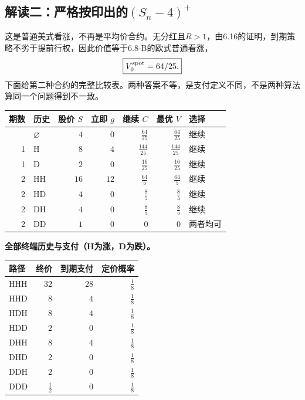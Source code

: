 \documentclass[11pt,a4paper,UTF8,fontset=fandol]{ctexart}
\begin{document}
\endgroup

\subsection{\texorpdfstring{解读二：严格按印出的\((S_n-4)^+\)}{解读二：严格按印出的(S\_n-4)\^{}+}}\label{ux89e3ux8bfbux4e8cux4e25ux683cux6309ux5370ux51faux7684s_n-4}

这是普通美式看涨，不再是平均价合约。无分红且\(R>1\)，由6.16的证明，到期策略不劣于提前行权，因此价值等于6.8-B的欧式普通看涨，
\[\boxed{V_0^{\rm spot}=64/25.}\]
下面给第二种合约的完整比较表。两种答案不等，是支付定义不同，不是两种算法算同一个问题得到不一致。

\begingroup
\small
\setlength{\tabcolsep}{4pt}
\renewcommand{\arraystretch}{1.10}

\begin{longtable}[]{@{}rlrrrrl@{}}
\toprule\noalign{}
期数 & 历史 & 股价 \(S\) & 立即 \(g\) & 继续 \(C\) & 最优 \(V\) &
选择 \\
\midrule\noalign{}
\endhead
\bottomrule\noalign{}
\endlastfoot
0 & \(\varnothing\) & \(4\) & \(0\) & \(\frac{64}{25}\) &
\(\frac{64}{25}\) & 继续 \\
1 & H & \(8\) & \(4\) & \(\frac{144}{25}\) & \(\frac{144}{25}\) &
继续 \\
1 & D & \(2\) & \(0\) & \(\frac{16}{25}\) & \(\frac{16}{25}\) & 继续 \\
2 & HH & \(16\) & \(12\) & \(\frac{64}{5}\) & \(\frac{64}{5}\) & 继续 \\
2 & HD & \(4\) & \(0\) & \(\frac{8}{5}\) & \(\frac{8}{5}\) & 继续 \\
2 & DH & \(4\) & \(0\) & \(\frac{8}{5}\) & \(\frac{8}{5}\) & 继续 \\
2 & DD & \(1\) & \(0\) & \(0\) & \(0\) & 两者均可 \\
\end{longtable}

\textbf{全部终端历史与支付（H为涨，D为跌）。}

\begin{longtable}[]{@{}lrrr@{}}
\toprule\noalign{}
路径 & 终价 & 到期支付 & 定价概率 \\
\midrule\noalign{}
\endhead
\bottomrule\noalign{}
\endlastfoot
HHH & \(32\) & \(28\) & \(\frac{1}{8}\) \\
HHD & \(8\) & \(4\) & \(\frac{1}{8}\) \\
HDH & \(8\) & \(4\) & \(\frac{1}{8}\) \\
HDD & \(2\) & \(0\) & \(\frac{1}{8}\) \\
DHH & \(8\) & \(4\) & \(\frac{1}{8}\) \\
DHD & \(2\) & \(0\) & \(\frac{1}{8}\) \\
DDH & \(2\) & \(0\) & \(\frac{1}{8}\) \\
DDD & \(\frac{1}{2}\) & \(0\) & \(\frac{1}{8}\) \\
\end{longtable}
\end{document}
